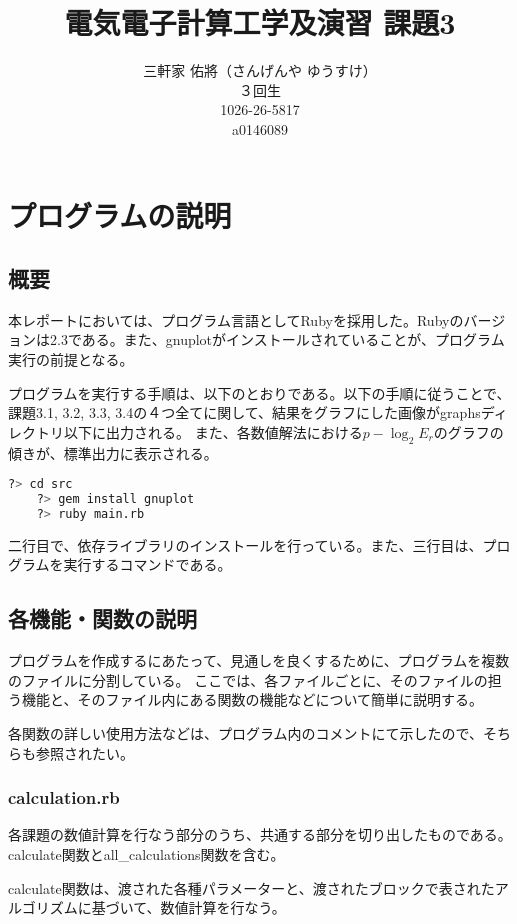 \documentclass[11pt]{jsarticle}
\title{電気電子計算工学及演習 課題3}
\author{三軒家 佑將（さんげんや ゆうすけ） \\ ３回生 \\ 1026-26-5817 \\ a0146089}
\date{}
\begin{document}
    \maketitle
    
    \section{プログラムの説明}
        \subsection{概要}
            本レポートにおいては、プログラム言語としてRubyを採用した。Rubyのバージョンは2.3である。また、gnuplotがインストールされていることが、プログラム実行の前提となる。

            プログラムを実行する手順は、以下のとおりである。以下の手順に従うことで、課題3.1, 3.2, 3.3, 3.4の４つ全てに関して、結果をグラフにした画像がgraphsディレクトリ以下に出力される。
            また、各数値解法における$p - \log_2 E_r$のグラフの傾きが、標準出力に表示される。
            \begin{lstlisting}[language=bash]
    ?> cd src
    ?> gem install gnuplot
    ?> ruby main.rb
            \end{lstlisting}
            二行目で、依存ライブラリのインストールを行っている。また、三行目は、プログラムを実行するコマンドである。

        \subsection{各機能・関数の説明}
            プログラムを作成するにあたって、見通しを良くするために、プログラムを複数のファイルに分割している。
            ここでは、各ファイルごとに、そのファイルの担う機能と、そのファイル内にある関数の機能などについて簡単に説明する。

            各関数の詳しい使用方法などは、プログラム内のコメントにて示したので、そちらも参照されたい。

            \subsubsection*{calculation.rb}
                各課題の数値計算を行なう部分のうち、共通する部分を切り出したものである。calculate関数とall\_calculations関数を含む。

                calculate関数は、渡された各種パラメーターと、渡されたブロックで表されたアルゴリズムに基づいて、数値計算を行なう。
\end{document}
